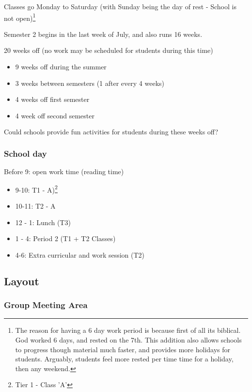 \documentclass[CSHFoundation.tex]{subfiles}
\begin{document}
Classes go Monday to Saturday (with Sunday being the day of rest - School is not open)\footnote{The reason for having a 6 day work period is because first of all its biblical. God worked 6 days, and rested on the 7th. This addition also allows schools to progress though material much faster, and provides more holidays for students. Arguably, students feel more rested per time time for a holiday, then any weekend.}

Semester 2 begins in the last week of July, and also runs 16 weeks.


20 weeks off (no work may be scheduled for students during this time)

\begin{itemize}
\item 9 weeks off during the summer
\item 3  weeks between semesters (1 after every 4 weeks)
\item 4 weeks off first semester
\item 4 week off second semester
\end{itemize}

Could schools provide fun activities for students during these weeks off?


\subsubsection{School day}



Before 9: open work time (reading time)
\begin{itemize}
\item 9-10: T1 - A)\footnote{Tier 1 - Class 'A'}
\item 10-11: T2 - A
\item 12 - 1: Lunch (T3)
\item 1 - 4: Period 2 (T1 + T2 Classes)
\item 4-6: Extra curricular and work session (T2)
\end{itemize}

\subsection{Layout}



\subsubsection{Group Meeting Area}
\end{document}
